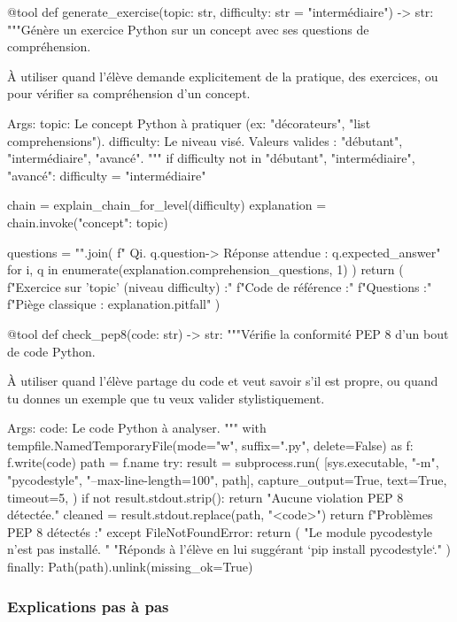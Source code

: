 \documentclass[11pt,a4paper]{article}
\begin{document}
\begin{pythoncode}
@tool
def generate_exercise(topic: str, difficulty: str = "intermédiaire") -> str:
    """Génère un exercice Python sur un concept avec ses questions de compréhension.

    À utiliser quand l'élève demande explicitement de la pratique, des
    exercices, ou pour vérifier sa compréhension d'un concept.

    Args:
        topic: Le concept Python à pratiquer (ex: "décorateurs", "list comprehensions").
        difficulty: Le niveau visé. Valeurs valides : "débutant", "intermédiaire", "avancé".
    """
    if difficulty not in {"débutant", "intermédiaire", "avancé"}:
        difficulty = "intermédiaire"

    chain = explain_chain_for_level(difficulty)
    explanation = chain.invoke({"concept": topic})

    questions = "\n".join(
        f"  Q{i}. {q.question}\n     -> Réponse attendue : {q.expected_answer}"
        for i, q in enumerate(explanation.comprehension_questions, 1)
    )
    return (
        f"Exercice sur '{topic}' (niveau {difficulty}) :\n\n"
        f"Code de référence :\n\n"
        f"Questions :\n\n"
        f"Piège classique : {explanation.pitfall}"
    )


@tool
def check_pep8(code: str) -> str:
    """Vérifie la conformité PEP 8 d'un bout de code Python.

    À utiliser quand l'élève partage du code et veut savoir s'il est
    propre, ou quand tu donnes un exemple que tu veux valider stylistiquement.

    Args:
        code: Le code Python à analyser.
    """
    with tempfile.NamedTemporaryFile(mode="w", suffix=".py", delete=False) as f:
        f.write(code)
        path = f.name
    try:
        result = subprocess.run(
            [sys.executable, "-m", "pycodestyle", "--max-line-length=100", path],
            capture_output=True, text=True, timeout=5,
        )
        if not result.stdout.strip():
            return "Aucune violation PEP 8 détectée."
        cleaned = result.stdout.replace(path, "<code>")
        return f"Problèmes PEP 8 détectés :"
    except FileNotFoundError:
        return (
            "Le module pycodestyle n'est pas installé. "
            "Réponds à l'élève en lui suggérant `pip install pycodestyle`."
        )
    finally:
        Path(path).unlink(missing_ok=True)
\end{pythoncode}

\subsubsection{Explications pas à pas}
\end{document}
